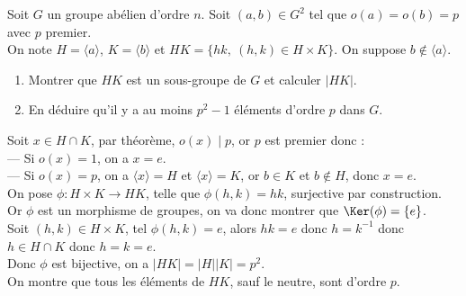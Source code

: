 \documentclass[11pt]{article}
\begin{document}
\begin{exercice}{}{}
    Soit $G$ un groupe abélien d'ordre $n$. Soit $(a,b)\in G^2$ tel que $o(a)=o(b)=p$ avec $p$ premier.\\
    On note $H=\langle a\rangle$, $K=\langle b\rangle$ et $HK=\{hk, ~ (h,k) \in H\times K\}$. On suppose $b\notin\langle a\rangle$.
    \begin{enumerate}
        \item Montrer que $HK$ est un sous-groupe de $G$ et calculer $|HK|$.
        \item En déduire qu'il y a au moins $p^2-1$ éléments d'ordre $p$ dans $G$.
    \end{enumerate}
    \tcblower
     Soit $x\in H\cap K$, par théorème, $o(x)\mid p$, or $p$ est premier donc :\\
    --- Si $o(x)=1$, on a $x=e$.\\
    --- Si $o(x)=p$, on a $\langle x \rangle = H$ et $\langle x \rangle = K$, or $b\in K$ et $b\notin H$, donc $x=e$.\\
    On pose $\phi:H\times K \to HK$, telle que $\phi(h,k)=hk$, surjective par construction.\\
    Or $\phi$ est un morphisme de groupes, on va donc montrer que $\Ker(\phi)=\{e\}$.\\
    Soit $(h,k)\in H\times K$, tel $\phi(h,k)=e$, alors $hk=e$ donc $h=k^{-1}$ donc $h\in H\cap K$ donc $h=k=e$.\\
    Donc $\phi$ est bijective, on a $|HK|=|H||K|=p^2$.\\
     On montre que tous les éléments de $HK$, sauf le neutre, sont d'ordre $p$.
\end{exercice}

\vspace*{-0.8cm}
\end{document}
